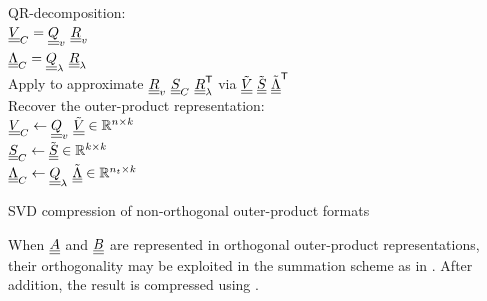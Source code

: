 \begin{algorithm}[hbt!]
	\vspace{0.2cm}
	\vspace{0.2cm}

	QR-decomposition:\\
	\qquad $\underline{\underline{V}}_C =  \underline{\underline{Q}}_v \ \underline{\underline{R}}_v$\\
	\qquad $\mLambda_C = \mQ_\lambda \ \mR_\lambda$    \\
	Apply  to approximate $\mR_v \ \mS_C \ \T{\mR}_\lambda$ via ${\tilde{\underline{\underline{V}}}} \ {\tilde{\underline{\underline{S}}}} \ {{\tilde{\underline{\underline{\Lambda}}}}}^{\sf T}$  \\
	Recover the outer-product representation:\\
	\qquad $\underline{\underline{V}}_C \leftarrow \underline{\underline{Q}}_v \ {\tilde{\underline{\underline{V}}}} \in {\mathbb{ R}}^{n\times k} $\\[0.1cm]
	\qquad $\underline{\underline{S}}_C \leftarrow {\tilde{\underline{\underline{S}}}} \in {\mathbb{ R}}^{k\times k}$ \\[0.1cm]
	\qquad $\mLambda_C \leftarrow  \mQ_\lambda \ \z\mLambda \in \ffR^{n_t \times k} $

	\caption{SVD compression of non-orthogonal outer-product formats}
	\label{alg:svd_on_svd_form}
\end{algorithm}

When $\underline{\underline{A}}$ and $\underline{\underline{B}}$ are represented in orthogonal outer-product representations, their orthogonality may be exploited in the summation scheme as in  \parencite{Bebendorf2008}. After addition, the result is compressed using .

